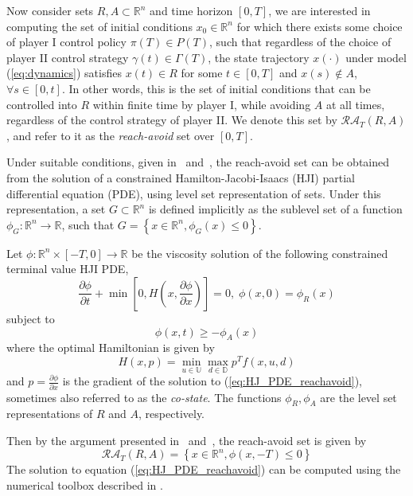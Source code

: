 \documentclass[letterpaper, 10 pt, conference]{ieeeconf}  %
\numberwithin{algorithm}{section}
\begin{document}
Now consider sets $R, A \subset \mathbb{R}^n$ and time horizon $[0, T]$, we are interested in computing the set of initial conditions $x_0 \in \mathbb{R}^n$ for which there exists some choice of player I control policy $\pi(T) \in P(T)$, such that regardless of the choice of player II control strategy $\gamma(t) \in \Gamma(T)$, the state trajectory $x(\cdot)$ under model (\ref{eq:dynamics}) satisfies $x(t) \in R$ for some $t \in [0,T]$ and $x(s) \notin A$, $\forall s \in [0,t]$.  In other words, this is the set of initial conditions that can be controlled into $R$ within finite time by player I, while avoiding $A$ at all times, regardless of the control strategy of player II.  We denote this set by $\mathcal{RA}_T(R,A)$, and refer to it as the \emph{reach-avoid} set over $[0,T]$.

Under suitable conditions, given in~\cite{j:mitchell-TAC-2005} and~\cite{mitchell-thesis}, the reach-avoid set can be obtained from the solution of a constrained Hamilton-Jacobi-Isaacs (HJI) partial differential equation (PDE), using level set representation of sets.  Under this representation, a set $G \subset \mathbb{R}^n$ is defined implicitly as the sublevel set of a function $\phi_G: \mathbb{R}^n \rightarrow \mathbb{R}$, such that $G = \left\{x\in \mathbb{R}^n, \phi_G (x) \leq 0\right\}$.

Let $\phi: \mathbb{R}^n \times [-T,0] \rightarrow \mathbb{R}$ be the viscosity solution \cite{j:Crandall-TAMS-1983} of the following constrained terminal value HJI PDE,
\begin{equation}
	\label{eq:HJ_PDE_reachavoid}
	\frac{\partial \phi}{\partial t} + \min \left[0, H\left(x,\frac{\partial \phi}{\partial x}\right)\right] = 0,\;\phi(x,0) = \phi_R(x)	 
\end{equation}
subject to 
$$\phi(x,t) \geq -\phi_A(x)$$
where the optimal Hamiltonian is given by
$$H\left(x,p\right) = \min_{u \in \mathbb{U}} \max_{d \in \mathbb{D}} p^T f(x,u,d)$$
and $p = \frac{\partial \phi}{\partial x}$ is the gradient of the solution to (\ref{eq:HJ_PDE_reachavoid}), sometimes also referred to as the \emph{co-state}.  The functions $\phi_R, \phi_A$ are the level set representations of $R$ and $A$, respectively.

Then by the argument presented in~\cite{j:mitchell-TAC-2005} and~\cite{mitchell-thesis}, the reach-avoid set is given by 
$$\mathcal{RA}_T(R,A) = \left\{x\in \mathbb{R}^n, \phi (x,-T) \leq 0\right\}$$
The solution to equation (\ref{eq:HJ_PDE_reachavoid}) can be computed using the numerical toolbox described in \cite{j:mitchell-jsc-2008}.
\end{document}
